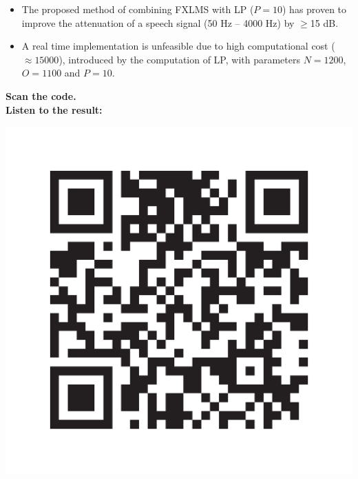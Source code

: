 \large
\begin{itemize}
	\item The proposed method of combining FXLMS with LP ($P=10$) has proven to improve the attenuation of a speech signal (50 Hz -- 4000 Hz) by  $\geq$15 dB. \\
	\item A real time implementation is unfeasible due to high computational cost ($\approx15000$), introduced by the computation of LP, with parameters $N=1200$, $O=1100$ and $P=10$. \\
\end{itemize}
\vspace{-5mm}
 \begin{minipage}{.8\columnwidth}
 	\begin{center}
	 	\textbf{Scan the code.}\\
	 	\textbf{Listen to the result:}
 	\end{center}
 \end{minipage}%
 \begin{minipage}{0.2\columnwidth}
 	\includegraphics[width=\textwidth]{figures/QRCODE.pdf}
 \end{minipage}